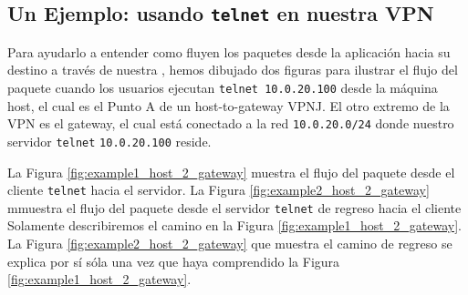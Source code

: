 \subsection{Un Ejemplo: usando {\tt telnet} en nuestra VPN} 

Para ayudarlo a entender como fluyen los paquetes desde la aplicación hacia su destino a través de nuestra \miniVPN, hemos dibujado dos figuras para ilustrar el flujo del paquete cuando los usuarios ejecutan  {\tt telnet 10.0.20.100} desde la máquina host, el cual es el Punto A de un host-to-gateway VPNJ. El otro extremo de la VPN es el gateway, el cual está conectado a la red {\tt 10.0.20.0/24}  donde nuestro servidor  {\tt telnet} {\tt 10.0.20.100} reside.

La Figura \ref{fig:example1_host_2_gateway} muestra el flujo del paquete desde el cliente {\tt telnet} hacia el servidor.
La Figura \ref{fig:example2_host_2_gateway}  mmuestra el flujo del paquete desde el servidor {\tt telnet} de regreso hacia el cliente
Solamente describiremos el camino en la Figura \ref{fig:example1_host_2_gateway}. La Figura \ref{fig:example2_host_2_gateway} que muestra el camino de regreso se explica por sí sóla una vez que haya comprendido la Figura \ref{fig:example1_host_2_gateway}.  

